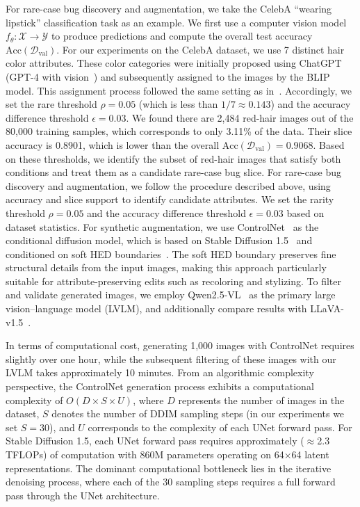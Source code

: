 \documentclass[10pt]{article} %
\newcommand{\controlnet}{ControlNet\xspace}
\newcommand{\qwen}{Qwen2.5-VL\xspace}
\newcommand{\llava}{LLaVA-v1.5\xspace}
\begin{document}
For rare-case bug discovery and augmentation, we take the CelebA “wearing lipstick” classification task as an example. We first use a computer vision model \(f_\theta\colon \mathcal{X}\to\mathcal{Y}\) to produce predictions and compute the overall test accuracy \(\mathrm{Acc}(\mathcal{D}_{\mathrm{val}})\). 
For our experiments on the CelebA dataset, we use 7 distinct hair color attributes. These color categories were initially proposed using ChatGPT (GPT-4 with vision~\citep{openai2023gpt4}) and subsequently assigned to the images by the BLIP~\citep{li2022blip} model. This assignment process followed the same setting as in~\citep{chen2023hibug}. Accordingly, we set the rare threshold \(\rho = 0.05\) (which is less than \(1/7 \approx 0.143\)) and the accuracy difference threshold \(\epsilon = 0.03\). We found there are 2{,}484 red-hair images out of the 80{,}000 training samples, which corresponds to only 3.11\% of the data. Their slice accuracy is 0.8901, which is lower than the overall \(\mathrm{Acc}(\mathcal{D}_{\mathrm{val}}) = 0.9068\). Based on these thresholds, we identify the subset of red-hair images that satisfy both conditions and treat them as a candidate rare-case bug slice.
For rare-case bug discovery and augmentation, we follow the procedure described above, using accuracy and slice support to identify candidate attributes. We set the rarity threshold \(\rho = 0.05\) and the accuracy difference threshold \(\epsilon = 0.03\) based on dataset statistics. For synthetic augmentation, we use \controlnet~\citep{zhang2023adding} as the conditional diffusion model, which is based on Stable Diffusion 1.5~\citep{rombach2022high} and conditioned on soft HED boundaries~\citep{xie2015holistically}. The soft HED boundary preserves fine structural details from the input images, making this approach particularly suitable for attribute-preserving edits such as recoloring and stylizing. To filter and validate generated images, we employ \qwen~\citep{bai2025qwen25vl} as the primary large vision--language model (LVLM), and additionally compare results with \llava~\citep{liu2023improvedllava}.

In terms of computational cost, generating 1,000 images with ControlNet requires slightly over one hour, while the subsequent filtering of these images with our LVLM takes approximately 10 minutes. From an algorithmic complexity perspective, the ControlNet generation process exhibits a computational complexity of $O(D \times S \times U)$, where $D$ represents the number of images in the dataset, $S$ denotes the number of DDIM sampling steps (in our experiments we set $S=30$), and $U$ corresponds to the complexity of each UNet forward pass. For Stable Diffusion 1.5, each UNet forward pass requires approximately (\(\approx\)2.3 TFLOPs) of computation with 860M parameters operating on 64×64 latent representations. The dominant computational bottleneck lies in the iterative denoising process, where each of the 30 sampling steps requires a full forward pass through the UNet architecture. 
\end{document}
